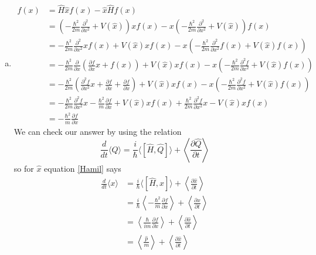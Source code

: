 \documentclass[11pt]{article}
\numberwithin{equation}{section}
\newcommand{\expt}[1]{\langle{#1}\rangle}
\begin{document}
\begin{enumerate}[(a)]
\item
\begin{align*}
[\hat{H},\hat{x}]f(x) &= \hat{H}\hat{x}f(x) - \hat{x}\hat{H}f(x)\\
&=  \left(-\frac{\hbar^2}{2m}\frac{\partial^2}{\partial x^2}+V(\hat{x})\right)xf(x) - x\left(-\frac{\hbar^2}{2m}\frac{\partial^2}{\partial x^2}+V(\hat{x})\right)f(x)\\
&=  -\frac{\hbar^2}{2m}\frac{\partial^2}{\partial x^2}xf(x)+V(\hat{x})xf(x) - x\left(-\frac{\hbar^2}{2m}\frac{\partial^2}{\partial x^2}f(x)+V(\hat{x})f(x)\right)\\
&=  -\frac{\hbar^2}{2m}\frac{\partial}{\partial x}\left(\frac{\partial f}{\partial x}x + f(x) \right)+V(\hat{x})xf(x) - x\left(-\frac{\hbar^2}{2m}\frac{\partial^2f}{\partial x^2}+V(\hat{x})f(x)\right)\\
&=  -\frac{\hbar^2}{2m}\left(\frac{\partial^2 f}{\partial x^2}x + \frac{\partial f}{\partial x} + \frac{\partial f}{\partial x}\right)+V(\hat{x})xf(x) - x\left(-\frac{\hbar^2}{2m}\frac{\partial^2f}{\partial x^2}+V(\hat{x})f(x)\right)\\
&=  -\frac{\hbar^2}{2m}\frac{\partial^2 f}{\partial x^2}x -\frac{\hbar^2}{m}\frac{\partial f}{\partial x} + V(\hat{x})xf(x) +\frac{\hbar^2}{2m}\frac{\partial^2f}{\partial x^2}x- V(\hat{x})xf(x)\\
&=  -\frac{\hbar^2}{m}\frac{\partial f}{\partial x} 
\end{align*}
We can check our answer by using the relation
\begin{equation}
\frac{d}{dt}\expt{Q} = \frac{i}{\hbar}\expt{[\hat{H},\hat{Q}]}+\left\langle\frac{\partial\hat{Q}}{\partial t}\right\rangle
\label{Hamil}
\end{equation}
so for $\hat{x}$ equation \ref{Hamil} says
\begin{align*}
\frac{d}{dt}\expt{x} &= \frac{i}{\hbar}\expt{[\hat{H},\hat{x}]}+\left\langle\frac{\partial\hat{x}}{\partial t}\right\rangle\\
&= \frac{i}{\hbar}\left\langle-\frac{\hbar^2}{m}\frac{\partial f}{\partial x}\right\rangle+\left\langle\frac{\partial\hat{x}}{\partial t}\right\rangle\\
&= \left\langle\frac{\hbar}{im}\frac{\partial f}{\partial x}\right\rangle+\left\langle\frac{\partial\hat{x}}{\partial t}\right\rangle\\
&= \left\langle\frac{\hat{p}}{m}\right\rangle+\left\langle\frac{\partial\hat{x}}{\partial t}\right\rangle
\end{align*}


\end{enumerate}
\end{document}
